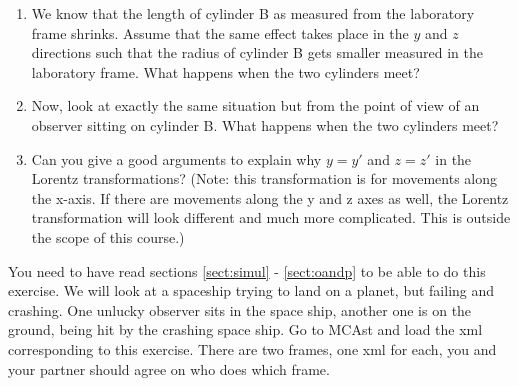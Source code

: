 {\begin{multicols}{2}
\begin{enumerate}
\item We know that the length of cylinder B as measured from the laboratory frame shrinks. Assume that the same effect takes place in the $y$ and $z$ directions such that the radius of cylinder B gets smaller measured in the laboratory frame. What happens when the two cylinders meet?
\item Now, look at exactly the same situation but from the point of view of an observer sitting on cylinder B. What happens when the two cylinders meet?
\item Can you give a good arguments to explain why $y=y'$ and $z=z'$ in the Lorentz transformations? (Note: this transformation is for movements along the x-axis. If there are movements along the y and z axes as well, the Lorentz transformation will look different and much more complicated. This is outside the scope of this course.) 
\end{enumerate}



\vspace{0.5cm}



You need to have read sections \ref{sect:simul} - \ref{sect:oandp} to be able to do this exercise. We will look at a spaceship trying to land on a planet, but failing and crashing. One unlucky observer sits in the space ship, another one is on the ground, being hit by the crashing space ship. Go to MCAst and load the xml corresponding to this exercise. There are two frames, one xml for each, you and your partner should agree on who does which frame. 


\end{multicols}}
